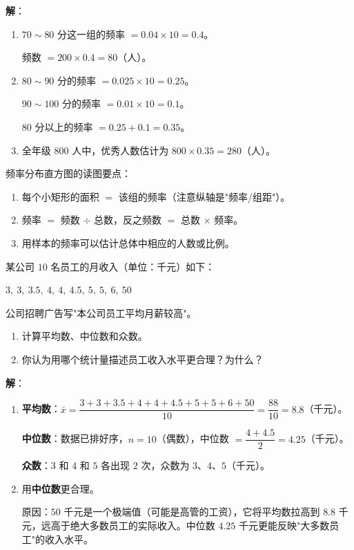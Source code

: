 \documentclass[12pt, a4paper]{ctexart}
\begin{document}
\textbf{解}：

\begin{enumerate}[leftmargin=2em]
  \item $70\sim80$ 分这一组的频率 $= 0.04 \times 10 = 0.4$。

  频数 $= 200 \times 0.4 = 80$（人）。

  \item $80\sim90$ 分的频率 $= 0.025 \times 10 = 0.25$。

  $90\sim100$ 分的频率 $= 0.01 \times 10 = 0.1$。

  $80$ 分以上的频率 $= 0.25 + 0.1 = 0.35$。

  \item 全年级 $800$ 人中，优秀人数估计为 $800 \times 0.35 = 280$（人）。
\end{enumerate}

\begin{tipbox}[方法总结]
频率分布直方图的读图要点：
\begin{enumerate}[leftmargin=2em]
  \item 每个小矩形的面积 $=$ 该组的频率（注意纵轴是"频率/组距"）。
  \item 频率 $=$ 频数 $\div$ 总数，反之频数 $=$ 总数 $\times$ 频率。
  \item 用样本的频率可以估计总体中相应的人数或比例。
\end{enumerate}
\end{tipbox}

\begin{examplebox}
某公司 $10$ 名员工的月收入（单位：千元）如下：

$3,\ 3,\ 3.5,\ 4,\ 4,\ 4.5,\ 5,\ 5,\ 6,\ 50$

公司招聘广告写"本公司员工平均月薪较高"。

\begin{enumerate}[leftmargin=2em]
  \item 计算平均数、中位数和众数。
  \item 你认为用哪个统计量描述员工收入水平更合理？为什么？
\end{enumerate}
\end{examplebox}

\textbf{解}：

\begin{enumerate}[leftmargin=2em]
  \item \textbf{平均数}：$\bar{x} = \dfrac{3+3+3.5+4+4+4.5+5+5+6+50}{10} = \dfrac{88}{10} = 8.8$（千元）。

  \textbf{中位数}：数据已排好序，$n = 10$（偶数），中位数 $= \dfrac{4+4.5}{2} = 4.25$（千元）。

  \textbf{众数}：$3$ 和 $4$ 和 $5$ 各出现 $2$ 次，众数为 $3$、$4$、$5$（千元）。

  \item 用\textbf{中位数}更合理。

  原因：$50$ 千元是一个极端值（可能是高管的工资），它将平均数拉高到 $8.8$ 千元，远高于绝大多数员工的实际收入。中位数 $4.25$ 千元更能反映"大多数员工"的收入水平。
\end{enumerate}
\end{document}
